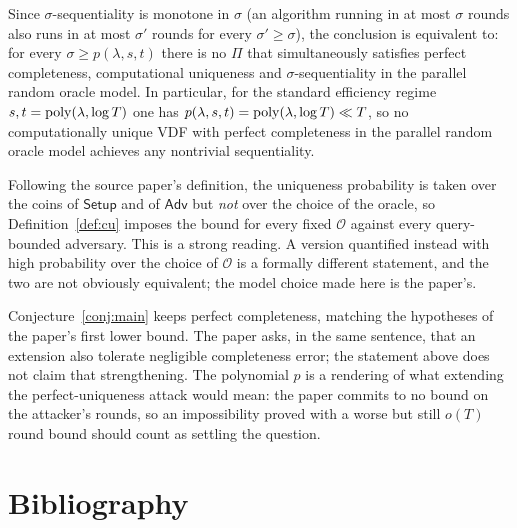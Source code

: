 \documentclass{aicr-conjecture}
\newcommand{\RO}{\mathcal{O}}
\newcommand{\Setup}{\mathsf{Setup}}
\newcommand{\Adv}{\mathsf{Adv}}
\begin{document}
\begin{remark}\label{rem:monotone}
Since $\sigma$-sequentiality is monotone in $\sigma$ (an algorithm running
in at most $\sigma$ rounds also runs in at most $\sigma'$ rounds for every
$\sigma' \ge \sigma$), the conclusion is equivalent to: for every
$\sigma \ge p(\lambda, s, t)$ there is no $\Pi$ that simultaneously
satisfies perfect completeness, computational uniqueness and
$\sigma$-sequentiality in the parallel random oracle model. In particular,
for the standard efficiency regime $s, t = \mathrm{poly}(\lambda, \log T)$ one has
$p(\lambda, s, t) = \mathrm{poly}(\lambda, \log T) \ll T$, so no computationally
unique VDF with perfect completeness in the parallel random oracle model
achieves any nontrivial sequentiality.
\end{remark}

\begin{remark}
\label{rem:quantifiers}
Following the source paper's definition, the uniqueness probability is
taken over the coins of $\Setup$ and of $\Adv$ but \emph{not} over the
choice of the oracle, so Definition~\ref{def:cu} imposes the bound for
every fixed $\RO$ against every query-bounded adversary. This is a strong
reading. A version quantified instead with high probability over the choice
of $\RO$ is a formally different statement, and the two are not obviously
equivalent; the model choice made here is the paper's.
\end{remark}

\begin{remark}\label{rem:scope}
Conjecture~\ref{conj:main} keeps perfect completeness, matching the
hypotheses of the paper's first lower bound. The paper asks, in the same
sentence, that an extension also tolerate negligible completeness error;
the statement above does not claim that strengthening. The polynomial $p$
is a rendering of what extending the perfect-uniqueness attack would mean:
the paper commits to no bound on the attacker's rounds, so an impossibility
proved with a worse but still $o(T)$ round bound should count as settling
the question.
\end{remark}

\section{Bibliography}
\end{document}
